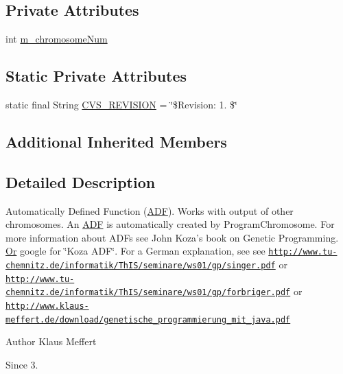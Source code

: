 \subsection*{Private Attributes}
\begin{DoxyCompactItemize}
\item 
int \hyperlink{classorg_1_1jgap_1_1gp_1_1function_1_1_a_d_f_a3d113b74e9c0e69bf6127e904de37766}{m\-\_\-chromosome\-Num}
\end{DoxyCompactItemize}
\subsection*{Static Private Attributes}
\begin{DoxyCompactItemize}
\item 
static final String \hyperlink{classorg_1_1jgap_1_1gp_1_1function_1_1_a_d_f_ada15fe1d91f5a31330979c9afc967ed2}{C\-V\-S\-\_\-\-R\-E\-V\-I\-S\-I\-O\-N} = \char`\"{}\$Revision\-: 1. \$\char`\"{}
\end{DoxyCompactItemize}
\subsection*{Additional Inherited Members}


\subsection{Detailed Description}
Automatically Defined Function (\hyperlink{classorg_1_1jgap_1_1gp_1_1function_1_1_a_d_f}{A\-D\-F}). Works with output of other chromosomes. An \hyperlink{classorg_1_1jgap_1_1gp_1_1function_1_1_a_d_f}{A\-D\-F} is automatically created by Program\-Chromosome. For more information about A\-D\-Fs see John Koza's book on Genetic Programming. \hyperlink{classorg_1_1jgap_1_1gp_1_1function_1_1_or}{Or} google for \char`\"{}\-Koza A\-D\-F\char`\"{}. For a German explanation, see see \href{http://www.tu-chemnitz.de/informatik/ThIS/seminare/ws01/gp/singer.pdf}{\tt http\-://www.\-tu-\/chemnitz.\-de/informatik/\-Th\-I\-S/seminare/ws01/gp/singer.\-pdf} or \href{http://www.tu-chemnitz.de/informatik/ThIS/seminare/ws01/gp/forbriger.pdf}{\tt http\-://www.\-tu-\/chemnitz.\-de/informatik/\-Th\-I\-S/seminare/ws01/gp/forbriger.\-pdf} or \href{http://www.klaus-meffert.de/download/genetische_programmierung_mit_java.pdf}{\tt http\-://www.\-klaus-\/meffert.\-de/download/genetische\-\_\-programmierung\-\_\-mit\-\_\-java.\-pdf}

\begin{DoxyAuthor}{Author}
Klaus Meffert 
\end{DoxyAuthor}
\begin{DoxySince}{Since}
3. 
\end{DoxySince}


